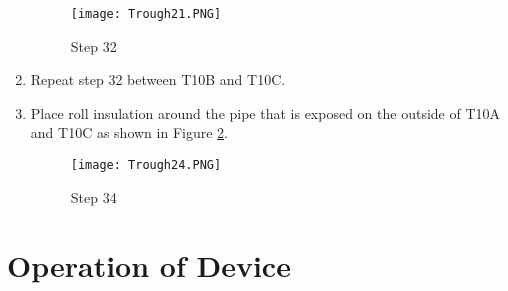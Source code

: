 \documentclass[11pt,english]{article}
\begin{document}
\begin{enumerate}
\begin{figure}[ht!]
\centering
\texttt{[image: Trough21.PNG]}
\caption{Step 32}
\label{fig:step32}
\end{figure}

\item   Repeat step 32 between T10B and T10C.
\item   Place roll insulation around the pipe that is exposed on the outside of T10A and T10C as shown in Figure \ref{fig:step34}. 

\begin{figure}[ht!]
\centering
\texttt{[image: Trough24.PNG]}
\caption{Step 34}
\label{fig:step34}
\end{figure}

\end{enumerate}


\pagebreak
\section{Operation of Device}
\end{document}
